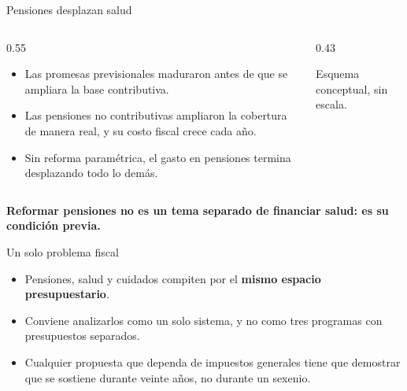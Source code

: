 \documentclass[aspectratio=169,11pt]{beamer}
\newcommand{\clave}[1]{\textcolor{acento}{\textbf{#1}}}
\newcommand{\destacar}[1]{%
  \vspace{0.5em}%
  \begin{center}%
    \colorbox{banda}{\parbox{0.92\textwidth}{\centering\vspace{0.3em}\textbf{#1}\vspace{0.3em}}}%
  \end{center}%
}
\begin{document}
\begin{frame}{Pensiones desplazan salud}
  \begin{columns}[T]
    \begin{column}{0.55\textwidth}
      \small
      \begin{itemize}
        \item Las promesas previsionales maduraron antes de que se ampliara la base contributiva.
        \item Las pensiones no contributivas ampliaron la cobertura de manera real, y su costo fiscal crece cada año.
        \item Sin reforma paramétrica, el gasto en pensiones termina desplazando todo lo demás.
      \end{itemize}
    \end{column}
    \begin{column}{0.43\textwidth}
      \vspace{1.2em}
      \begin{center}
      \end{center}
      \vspace{0.4em}
      {\tiny\color{grisfino}Esquema conceptual, sin escala.}
    \end{column}
  \end{columns}
  \destacar{Reformar pensiones no es un tema separado de financiar salud: es su condición previa.}
\end{frame}

\begin{frame}{Un solo problema fiscal}
  \begin{itemize}
    \item Pensiones, salud y cuidados compiten por el \clave{mismo espacio presupuestario}.
    \item Conviene analizarlos como un solo sistema, y no como tres programas con presupuestos separados.
    \item Cualquier propuesta que dependa de impuestos generales tiene que demostrar que se sostiene durante veinte años, no durante un sexenio.
  \end{itemize}
\end{frame}
\end{document}
